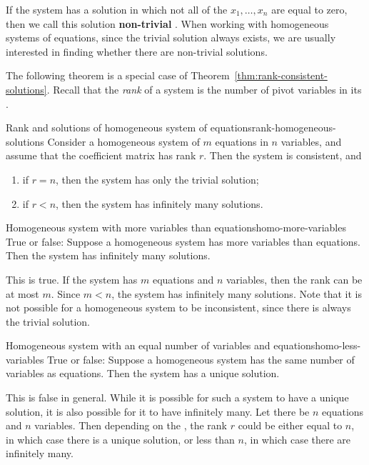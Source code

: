 If the system has a solution in which not all of the
$x_1,\ldots, x_n$ are equal to zero, then we call this solution
\textbf{non-trivial}%
%
.  When
working with homogeneous systems of equations, since the trivial
solution always exists, we are usually interested in finding whether
there are non-trivial solutions.

The following theorem is a special case of
Theorem~\ref{thm:rank-consistent-solutions}. Recall that the
{\em rank}
of a system is the number of pivot variables in its {\ef}.

\begin{theorem}{Rank and solutions of homogeneous system of equations}{rank-homogeneous-solutions}
  Consider a homogeneous system of $m$ equations in $n$ variables, and
  assume that the coefficient matrix has rank $r$. Then the system is
  consistent, and
  \begin{enumerate}
  \item if $r=n$, then the system has only the trivial solution;
  \item if $r<n$, then the system has infinitely many solutions.
  \end{enumerate}
\end{theorem}

\begin{example}{Homogeneous system with more variables than equations}{homo-more-variables}
  True or false: Suppose a homogeneous system has more variables than
  equations. Then the system has infinitely many solutions.
\end{example}

\begin{solution}
  This is true. If the system has $m$ equations and $n$ variables,
  then the rank can be at most $m$. Since $m<n$, the system has
  infinitely many solutions. Note that it is not possible for a
  homogeneous system to be inconsistent, since there is always the
  trivial solution.
\end{solution}

\begin{example}{Homogeneous system with an equal number of variables and equations}{homo-less-variables}
  True or false: Suppose a homogeneous system has the same number of
  variables as equations. Then the system has a unique solution.
\end{example}

\begin{solution}
  This is false in general. While it is possible for such a system to
  have a unique solution, it is also possible for it to have
  infinitely many. Let there be $n$ equations and $n$ variables.  Then
  depending on the {\ef}, the rank $r$ could be either equal to $n$,
  in which case there is a unique solution, or less than $n$, in which
  case there are infinitely many.
\end{solution}


